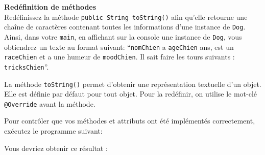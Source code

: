 \begin{Exercice}[5 minutes] \textbf{Redéfinition de méthodes}\\
    Redéfinissez la méthode \lstinline{public String toString()} afin qu'elle retourne une chaîne de caractères contenant toutes les informations d'une instance de \lstinline{Dog}. Ainsi, dans votre \lstinline{main}, en affichant sur la console une instance de \lstinline{Dog}, vous obtiendrez un texte au format suivant:
    ``\lstinline{nomChien} a \lstinline{ageChien} ans, est un \lstinline{raceChien} et a une humeur de \lstinline{moodChien}. Il sait faire les tours suivants : \lstinline{tricksChien}''.

    \begin{conseil}
        La méthode \lstinline{toString()} permet d'obtenir une représentation textuelle d'un objet. Elle est définie par défaut pour tout objet. Pour la redéfinir, on utilise le mot-clé \lstinline{@Override} avant la méthode.
    \end{conseil}

    \begin{solution}
        
    \end{solution}
\end{Exercice}
Pour contrôler que vos méthodes et attributs ont été implémentés correctement, exécutez le programme suivant:
	
	
Vous devriez obtenir ce résultat :
    


